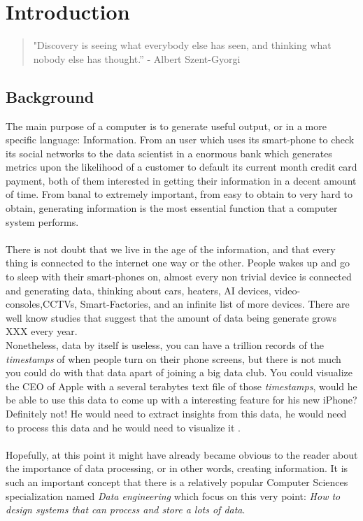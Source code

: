 \section{Introduction}
\begin{verse}
"Discovery is seeing what everybody else has seen, and thinking what nobody else has thought.” - Albert Szent-Gyorgi
\end{verse}
\subsection{Background}
The main purpose of a computer is to generate useful output, or in a more specific language: Information. From an user which uses its smart-phone to check its 
social networks to the data scientist in a enormous bank which generates metrics upon the likelihood of a customer to default its current month credit card payment, both of them interested in getting their information in a decent amount of time. From banal to extremely important, from easy to obtain to very hard to obtain, generating information is the most essential function that a computer system performs. \\ \\

There is not doubt that we live in the age of the information, and that every thing is connected to the internet one way or the other. People wakes up and go to sleep with their smart-phones on, almost every non trivial device is connected and generating data, thinking about cars, heaters, AI devices, video-consoles,CCTVs, Smart-Factories, and an infinite list of more devices. There are well know studies that suggest that the amount of data being generate grows XXX every year. \\ 

Nonetheless, data by itself is useless, you can have a trillion records of the \textit{timestamps} of when people turn on their phone screens, but there is not much you could do with that data apart of joining a big data club. You could visualize the CEO of Apple with a several terabytes text file of those \textit{timestamps}, would he be able to use this data to come up with a interesting feature for his new iPhone? Definitely not! He would need to extract insights from this data, he would need to process this data and he would need to visualize it \-. \\ \\

Hopefully, at this point it might have already became obvious to the reader about the importance of data processing, or in other words, creating information. It is such an important concept that there is a relatively popular Computer Sciences specialization named \textit{Data engineering} which focus on this very point: \textit{How to design systems that can process and store a lots of data}. \\ \\

